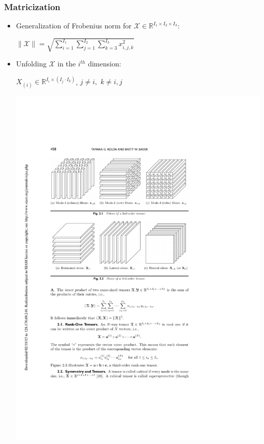 \documentclass{beamer}
\begin{document}

\begin{frame}
\frametitle{Matricization}
\begin{itemize}
\item Generalization of Frobenius norm for $\mathcal{X}\in \mathbb{R}^{I_1\times I_2 \times I_3}$:\\ \begin{center} $\| \mathcal{X} \|=\sqrt{\sum\limits_{i=1}^{I_1}\sum\limits_{j=1}^{I_2}\sum\limits_{k=3}^{I_3}x_{i,j,k}^2}$\end{center}
\item Unfolding $ \mathcal{X}$ in the $i^{th}$ dimension:\\ \begin{center} $X_{(i)}\in \mathbb{R}^{I_i\times (I_j\cdot I_k)}$, $j\neq i,$ $k\neq i,j$  \end{center}
\begin{center}
\includegraphics[scale=0.7]{Matricize}

\end{center}
\end{itemize}
\end{frame}
\end{document}
